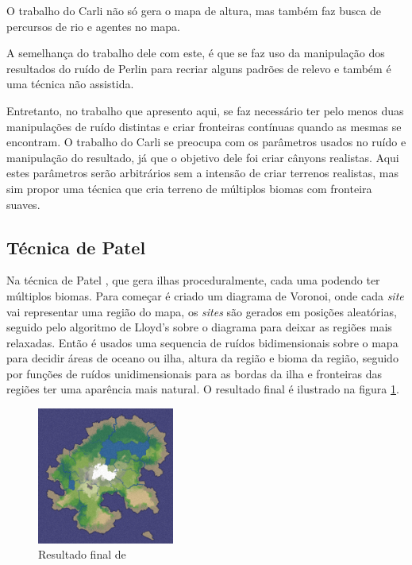 O trabalho do Carli \cite{carli2012canion} não só gera o mapa de altura, mas também
faz busca de percursos de rio e agentes no mapa.

A semelhança do 
trabalho dele com este, é que se faz uso da manipulação dos resultados do ruído
de Perlin para recriar alguns padrões de relevo e também é uma técnica não assistida.


Entretanto, no trabalho  
que apresento aqui, se faz necessário ter pelo menos duas manipulações de ruído distintas
e criar fronteiras contínuas quando as mesmas se encontram. O trabalho 
do Carli \cite{carli2012canion} se preocupa com os parâmetros usados no ruído e manipulação do
resultado, já que o objetivo dele foi criar cânyons realistas. Aqui estes parâmetros serão arbitrários
sem a intensão de criar terrenos realistas, mas sim propor uma técnica que cria terreno de múltiplos biomas com fronteira suaves.

\subsection{Técnica de Patel}
Na técnica de Patel \cite{patel2010polygonal}, que gera ilhas proceduralmente, cada uma podendo ter
múltiplos biomas. Para começar é criado um diagrama de Voronoi, onde cada \textit{site}
vai representar uma região do mapa, os \textit{sites} são gerados em posições
aleatórias, seguido pelo algoritmo de Lloyd's sobre o diagrama para
deixar as regiões mais relaxadas.
Então é usados uma sequencia de ruídos bidimensionais sobre o mapa para decidir
áreas de oceano ou ilha, altura da região e bioma da região, seguido por funções
de ruídos unidimensionais para as bordas da ilha e fronteiras das regiões ter
uma aparência mais natural. O resultado final é ilustrado na
figura \ref{fig:voronoi-map-goal-distorted}.
\begin{figure}[H]
    \centering
    \includegraphics[width=0.4\textwidth]{figuras/voronoi-map-goal-distorted.png}
    \caption{Resultado final de \cite{patel2010polygonal}}
    \label{fig:voronoi-map-goal-distorted}
\end{figure}

